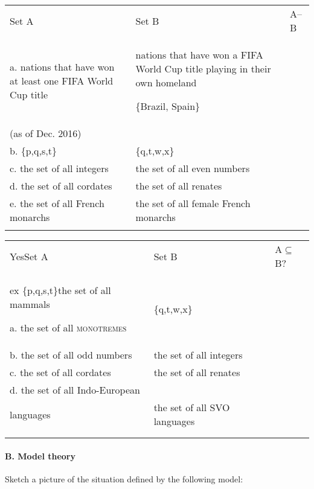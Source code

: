     \z
\ea \label{ex:13.}%
    \label{ex:key:3}




        

\begin{tabularx}{\textwidth}{XXX}
\lsptoprule

 Set A & Set B & A–B\\
a. nations that have won at least one FIFA World Cup title & nations that have won a FIFA World Cup title playing in their own homeland
                       

\{Brazil, Spain\}\\
(as of Dec. 2016) & \\
b. \{p,q,s,t\} & \{q,t,w,x\} & \\
c. the set of all integers & the set of all even numbers & \\
d. the set of all cordates & the set of all renates & \\
e. the set of all French monarchs & the set of all female French monarchs & \\
\lspbottomrule
\end{tabularx}
    \z
\ea \label{ex:13.}%
    \label{ex:key:4}




        

\begin{tabularx}{\textwidth}{XXX}
\lsptoprule

YesSet A & Set B & A${\subseteq}$B?\\
ex \{p,q,s,t\}the set of all mammals

a. the set of all \textsc{monotremes} & \{q,t,w,x\} & \\
b. the set of all odd numbers & the set of all integers & \\
c. the set of all cordates & the set of all renates & \\
d. the set of all Indo-European\\
    languages & the set of all SVO languages & \\
&  & \\
\lspbottomrule
\end{tabularx}
    \z
\paragraph{B. Model theory}

\ea \label{ex:13.}%
    \label{ex:key:1}




         Sketch a picture of the situation defined by the following model:

